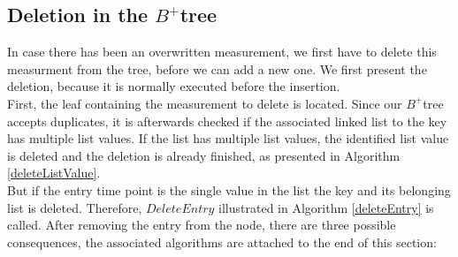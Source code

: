 \documentclass[abstracton,12pt,oneside]{scrreprt}
\begin{document}
\subsection{Deletion in the $B^+$tree}
\label{delete}
In case there has been an overwritten measurement, we first have to delete this measurment from the tree, before we can add a new one. We first present the deletion, because it is normally executed before the insertion. \\
First, the leaf containing the measurement to delete is located. Since our $B^+$tree accepts duplicates, it is afterwards checked if the associated linked list to the key has multiple list values. If the list has multiple list values, the identified list value is deleted and the deletion is already finished, as presented in Algorithm \ref{deleteListValue}. \\
But if the entry time point is the single value in the list the key and its belonging list is deleted. Therefore, $DeleteEntry$ illustrated in Algorithm \ref{deleteEntry} is called. After removing the entry from the node, there are three possible consequences, the associated algorithms are attached to the end of this section:
\end{document}
